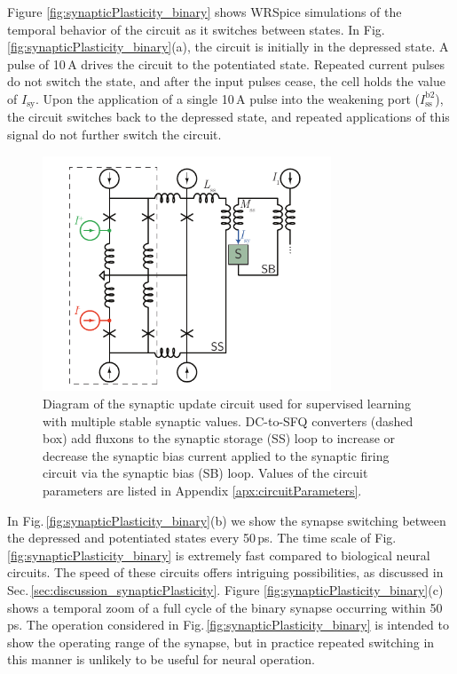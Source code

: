 \documentclass[twocolumn]{article}
\begin{document}
Figure \ref{fig:synapticPlasticity_binary} shows WRSpice simulations of the temporal behavior of the circuit as it switches between states. In Fig.\,\ref{fig:synapticPlasticity_binary}(a), the circuit is initially in the depressed state. A pulse of 10\,\textmu A drives the circuit to the potentiated state. Repeated current pulses do not switch the state, and after the input pulses cease, the cell holds the value of $I_{\mathrm{sy}}$. Upon the application of a single 10\,\textmu A pulse into the weakening port ($I_{\mathrm{ss}}^{\mathrm{b2}}$), the circuit switches back to the depressed state, and repeated applications of this signal do not further switch the circuit.

\begin{figure}[t!]
	\centerline{\includegraphics[width=8.6cm]{_synapticPlasticity_supervisedCircuit_small.pdf}}
	\caption{\label{fig:synapticPlasticity_supervisedCircuit} Diagram of the synaptic update circuit used for supervised learning with multiple stable synaptic values. DC-to-SFQ converters (dashed box) add fluxons to the synaptic storage (SS) loop to increase or decrease the synaptic bias current applied to the synaptic firing circuit via the synaptic bias (SB) loop. Values of the circuit parameters are listed in Appendix \ref{apx:circuitParameters}.}
\end{figure}
In Fig.\,\ref{fig:synapticPlasticity_binary}(b) we show the synapse switching between the depressed and potentiated states every 50\,ps. The time scale of Fig.\,\ref{fig:synapticPlasticity_binary} is extremely fast compared to biological neural circuits. The speed of these circuits offers intriguing possibilities, as discussed in Sec.\,\ref{sec:discussion_synapticPlasticity}. Figure \ref{fig:synapticPlasticity_binary}(c) shows a temporal zoom of a full cycle of the binary synapse occurring within 50\,ps. The operation considered in Fig.\,\ref{fig:synapticPlasticity_binary} is intended to show the operating range of the synapse, but in practice repeated switching in this manner is unlikely to be useful for neural operation.   
\end{document}
